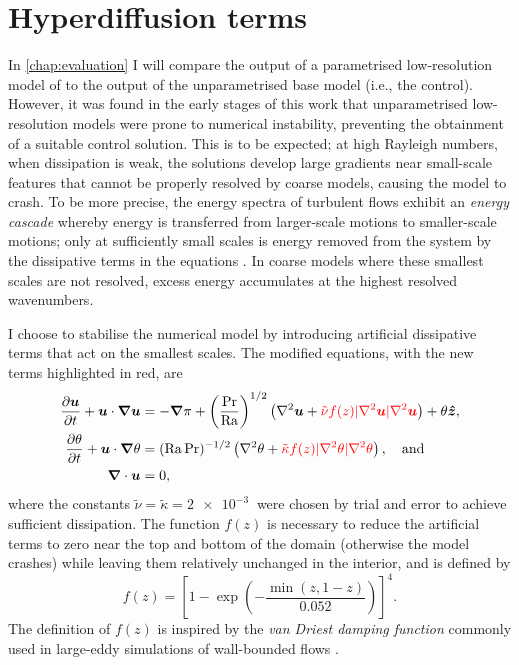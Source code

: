 \documentclass[../main.tex]{subfiles}
\begin{document}
\section{Hyperdiffusion terms} \label{sec:hyper}
In \cref{chap:evaluation} I will compare the output of a parametrised
low-resolution model of  to the
output of the unparametrised base model (i.e., the control). However, it was
found in the early stages of this work that unparametrised low-resolution
models were prone to numerical instability, preventing the obtainment of a
suitable control solution. This is to be expected; at high Rayleigh numbers,
when dissipation is weak, the solutions develop large gradients near
small-scale features that cannot be properly resolved by coarse models, causing
the model to crash. To be more precise, the energy spectra of turbulent flows
exhibit an \emph{energy cascade} whereby energy is transferred from
larger-scale motions to smaller-scale motions; only at sufficiently small
scales is energy removed from the system by the dissipative terms in the
equations \parencite{pope2000}. In coarse models where these smallest scales
are not resolved, excess energy accumulates at the highest resolved
wavenumbers.

I choose to stabilise the numerical model by introducing artificial dissipative
terms that act on the smallest scales. The modified equations, with the new
terms highlighted in red, are
\begin{align}
    \label{eqn:hyper_momentum}
    \frac{\partial \bm{u}}{\partial t} + \bm{u} \cdot \bm{\nabla} \bm{u}
        &= -\bm{\nabla} \pi + \left( \frac{\mathrm{Pr}}{\mathrm{Ra}}\right)^{1/2}
            \left(
                \nabla^2 \bm{u} + {\color{red}
                \tilde{\nu} f(z) |\nabla^2 \bm{u}| \nabla^2 \bm{u}}
            \right)
            + \theta \bm{\hat{z}}, \\
    \label{eqn:hyper_energy}
    \frac{\partial \theta}{\partial t} + \bm{u} \cdot \bm{\nabla} \theta
        &= (\mathrm{Ra}\,\mathrm{Pr})^{-1/2}
            \left(
                \nabla^2 \theta + {\color{red}
                \tilde{\kappa} f(z) |\nabla^2 \theta| \nabla^2 \theta}
            \right), \quad \text{and} \\
    \label{eqn:hyper_incompressible}
    \bm{\nabla} \cdot \bm{u} &= 0,
\end{align}
where the constants $\tilde{\nu} = \tilde{\kappa} = \SI{2e-3}{}$ were chosen by
trial and error to achieve sufficient dissipation. The function $f(z)$ is
necessary to reduce the artificial terms to zero near the top and bottom of the
domain (otherwise the model crashes) while leaving them relatively unchanged
in the interior, and is defined by
\[
    f(z) = \left[
        1 - \exp \left( -\frac{\min(z, 1-z)}{0.052} \right)
    \right]^4.
\]
The definition of $f(z)$ is inspired by the \emph{van Driest damping function}
commonly used in large-eddy simulations of wall-bounded flows
\parencite{pope2000}.
\end{document}

